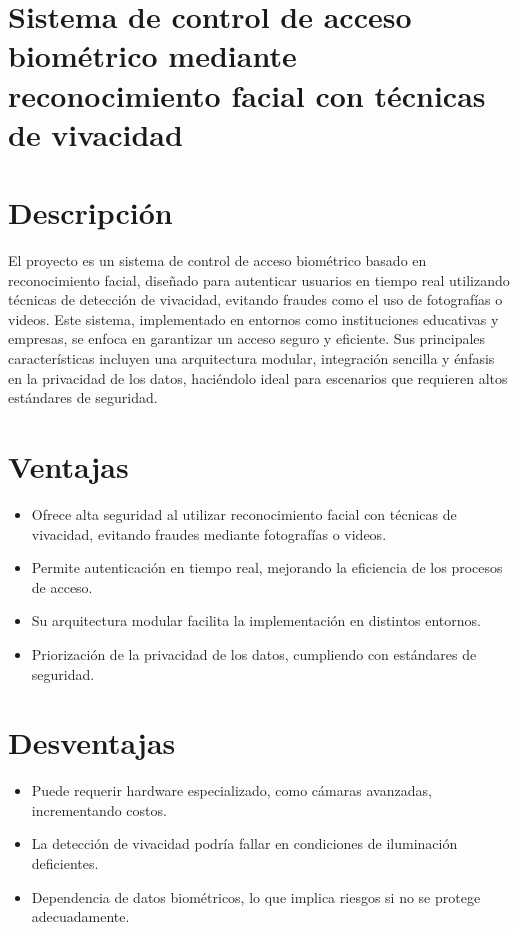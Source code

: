 \section{Sistema de control de acceso biométrico mediante reconocimiento facial con técnicas de vivacidad}

\section{Descripción}

El proyecto es un sistema de control de acceso biométrico basado en reconocimiento facial, diseñado para autenticar usuarios en tiempo real utilizando técnicas de detección de vivacidad, evitando fraudes como el uso de fotografías o videos. Este sistema, implementado en entornos como instituciones educativas y empresas, se enfoca en garantizar un acceso seguro y eficiente. Sus principales características incluyen una arquitectura modular, integración sencilla y énfasis en la privacidad de los datos, haciéndolo ideal para escenarios que requieren altos estándares de seguridad.

\section{Ventajas}

\begin{itemize}
    \item Ofrece alta seguridad al utilizar reconocimiento facial con técnicas de vivacidad, evitando fraudes mediante fotografías o videos.
    \item Permite autenticación en tiempo real, mejorando la eficiencia de los procesos de acceso.
    \item Su arquitectura modular facilita la implementación en distintos entornos.
    \item Priorización de la privacidad de los datos, cumpliendo con estándares de seguridad.
\end{itemize}

\section{Desventajas}

\begin{itemize}
    \item Puede requerir hardware especializado, como cámaras avanzadas, incrementando costos.
    \item La detección de vivacidad podría fallar en condiciones de iluminación deficientes.
    \item Dependencia de datos biométricos, lo que implica riesgos si no se protege adecuadamente.
\end{itemize}